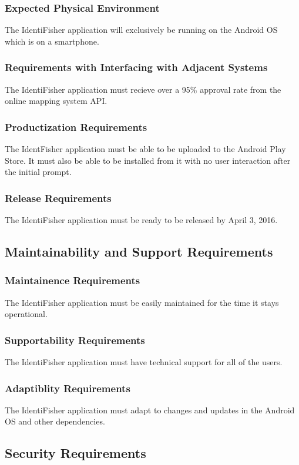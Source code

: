 \documentclass{article}
\begin{document}
\subsubsection{Expected Physical Environment}
The IdentiFisher application will exclusively be running on the Android OS which is on a smartphone.
\subsubsection{Requirements with Interfacing with Adjacent Systems}
The IdentiFisher application must recieve over a 95\% approval rate from the online mapping system API.
\subsubsection{Productization Requirements}
The IdentFisher application must be able to be uploaded to the Android Play Store. It must also be able to be installed from it with no user interaction after the initial prompt.
\subsubsection{Release Requirements}
The IdentiFisher application must be ready to be released by April 3, 2016.

\subsection{Maintainability and Support Requirements}
\subsubsection{Maintainence Requirements}
The IdentiFisher application must be easily maintained for the time it stays operational.
\subsubsection{Supportability Requirements}
The IdentiFisher application must have technical support for all of the users.
\subsubsection{Adaptiblity Requirements}
The IdentiFisher application must adapt to changes and updates in the Android OS and other dependencies.

\subsection{Security Requirements}
\end{document}
